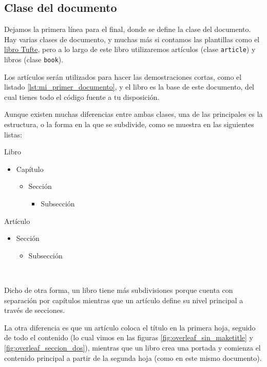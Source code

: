 \subsection{Clase del documento}
\label{sub:clase_del_documento}



Dejamos la primera línea para el final, donde se define la clase del documento. Hay varias clases de documento, y muchas más si contamos las plantillas como el \href{https://www.latextemplates.com/template/tufte-style-book}{libro Tufte}, pero a lo largo de este libro utilizaremos artículos (clase \texttt{article}) y libros (clase \texttt{book}).

Los artículos serán utilizados para hacer las demostraciones cortas, como el listado \ref{lst:mi_primer_documento}, y el libro es la base de este documento, del cual tienes todo el código fuente a tu disposición.

Aunque existen muchas diferencias entre ambas clases, una de las principales es la estructura, o la forma en la que se subdivide, como se muestra en las siguientes listas:

\begin{multicols}{2}
Libro
\begin{itemize}
	\item Capítulo
	\begin{itemize}
		\item Sección
		\begin{itemize}
			\item Subsección
		\end{itemize}
	\end{itemize}
\end{itemize}

\columnbreak

Artículo
\begin{itemize}
	\item Sección
	\begin{itemize}
		\item Subsección
	\end{itemize}
\end{itemize}
~
\end{multicols}

Dicho de otra forma, un libro tiene más subdivisiones porque cuenta con separación por capítulos mientras que un artículo define su nivel principal a través de secciones.

La otra diferencia es que un artículo coloca el título en la primera hoja, seguido de todo el contenido (lo cual vimos en las figuras \ref{fig:overleaf_sin_maketitle} y \ref{fig:overleaf_seccion_dos}), mientras que un libro crea una portada y comienza el contenido principal a partir de la segunda hoja (como en este mismo documento).

